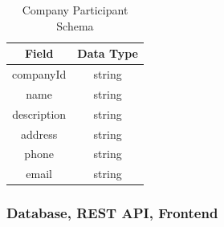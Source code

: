 \documentclass[11pt,journal]{IEEEtran}
\begin{document}
\begin{table}[H]
  \renewcommand{\arraystretch}{1.3}
  \caption{Company Participant Schema}
  \label{tab:CompanySchema}
  \centering
  \begin{tabular}{|c|c|}
    \hline
    Field & Data Type\\
    \hline
    companyId & string \\
    name & string \\
    description & string \\
    address & string \\
    phone & string \\
    email & string \\
    \hline
  \end{tabular}
\end{table}

\subsubsection{Database, REST API, Frontend}
\end{document}
